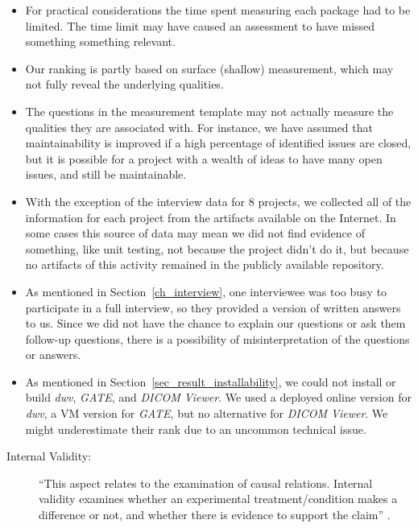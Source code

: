 \documentclass[final, 3p, times, authoryear]{elsarticle}
\begin{document}
\begin{itemize}
\item For practical considerations the time spent measuring each package had to
be limited.  The time limit may have caused an assessment to have missed
something something relevant.
\item Our ranking is partly based on surface (shallow) measurement, which may
not fully reveal the underlying qualities.
\item The questions in the measurement template may not actually measure the
qualities they are associated with.  For instance, we have assumed that
maintainability is improved if a high percentage of identified issues are
closed, but it is possible for a project with a wealth of ideas to have many
open issues, and still be maintainable.
\item With the exception of the interview data for 8 projects, we collected all
of the information for each project from the artifacts available on the
Internet. In some cases this source of data may mean we did not find evidence of
something, like unit testing, not because the project didn't do it, but because
no artifacts of this activity remained in the publicly available repository.
\item As mentioned in Section~\ref{ch_interview}, one interviewee was too busy
to participate in a full interview, so they provided a version of written answers
to us. Since we did not have the chance to explain our questions or ask them
follow-up questions, there is a possibility of misinterpretation of the
questions or answers.
\item As mentioned in Section~\ref{sec_result_installability}, we could not
install or build \textit{dwv}, \textit{GATE}, and \textit{DICOM Viewer}. We used
a deployed online version for \textit{dwv}, a VM version for \textit{GATE}, but
no alternative for \textit{DICOM Viewer}. We might underestimate their rank due
to an uncommon technical issue.
\end{itemize}

\begin{description}
    \item[Internal Validity:] ``This aspect relates to the examination of causal
    relations. Internal validity examines whether an experimental
    treatment/condition makes a difference or not, and whether there is evidence
    to support the claim'' \citep{AmpatzoglouEtAl2019}.
\end{description}
\end{document}
